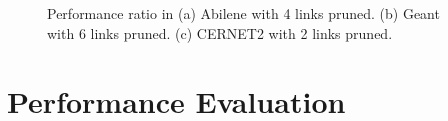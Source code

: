 \documentclass[conference]{IEEEtran}
\begin{document}
\begin{figure}[!t]
\centering
{}
\vspace{-0.1in}
\caption{Performance ratio in (a) Abilene with 4 links pruned. (b) Geant with 6 links pruned. (c) CERNET2 with 2 links pruned.}
\label{figure_exp2_sort}
\vspace{-0.1in}
\end{figure}


\section{Performance Evaluation}
\label{performance_evaluation}
\end{document}
